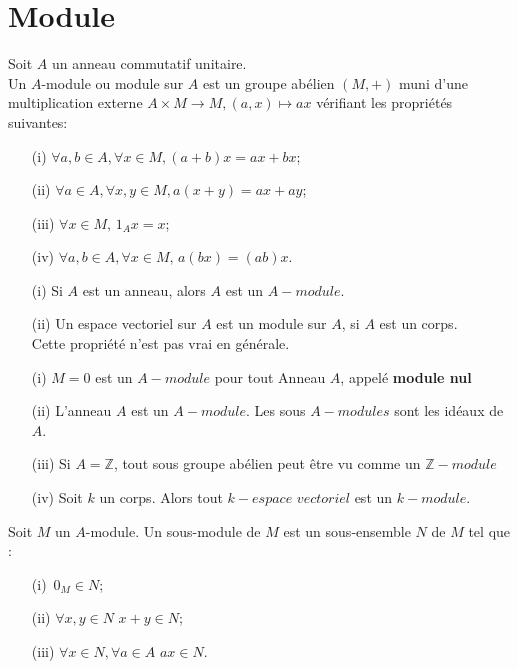 \section{Module}
\begin{madefinition}
	Soit $A$ un anneau commutatif unitaire.\\
	Un $A$-module ou module sur $A$ est un groupe abélien $(M,+)$ muni d'une multiplication externe $A \times M \rightarrow M, (a,x) \mapsto ax$ vérifiant les propriétés suivantes:
	\begin{enumerate}
		\item[(i)]$ \forall a, b \in A, \forall x \in M,(a+b)x = ax+bx$;
		\item[(ii)] $ \forall a \in A, \forall x, y \in M,a(x+y) = ax+ay$;
		\item[(iii)] $ \forall x \in M, \,1_A x = x$;
		\item[(iv)] $\forall a, b \in A, \forall x \in M, \, a(bx)=(ab)x$.
	\end{enumerate}
\end{madefinition}
\begin{maremarque}
	\begin{enumerate}
		\item[(i)] Si $A$ est un anneau, alors $A$ est un $A-module$.
		\item[(ii)] Un espace vectoriel sur $A$ est un module sur $A$, si $A$ est un corps.
		\\ Cette propriété n'est pas vrai en générale.
	\end{enumerate}
\end{maremarque}
\begin{monexemple}
		\begin{enumerate}
		\item[(i)] $M={0}$ est un $A-module$ pour tout Anneau $A$, appelé \textbf{module nul}
		\item[(ii)] L'anneau $A$ est un $A-module$. Les sous $A-modules$ sont les idéaux de $A$.
		\item[(iii)] Si $A= \mathbb{Z}$, tout sous groupe abélien peut être vu comme un $\mathbb{Z}-module$
		\item[(iv)] Soit $k$ un corps.  Alors tout $k-espace$ $vectoriel$ est un $k-module$. 
	\end{enumerate}
\end{monexemple}
\begin{madefinition}
	Soit $M$ un $A$-module. Un sous-module de $M$ est un sous-ensemble $N$ de $M$ tel que :
	\begin{enumerate}
		\item[(i)]$ \, 0_M \in N$;
		\item[(ii)]$ \forall x, y \in N \, \, x+y \in N$;
		\item[(iii)] $\forall x \in N, \forall a \in A \, \, ax \in N$.
	\end{enumerate}
\end{madefinition}
